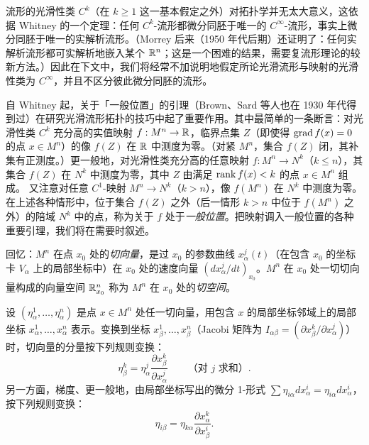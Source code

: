 流形的光滑性类 $C^k$（在 $k\ge1$ 这一基本假定之外）对拓扑学并无太大意义，这依据 Whitney 的一个定理：任何 $C^k$-流形都微分同胚于唯一的 $C^\infty$-流形，事实上微分同胚于唯一的实解析流形。（Morrey 后来（1950 年代后期）还证明了：任何实解析流形都可实解析地嵌入某个 $\mathbb{R}^n$；这是一个困难的结果，需要复流形理论的较新方法。）因此在下文中，我们将经常不加说明地假定所论光滑流形与映射的光滑性类为 $C^\infty$，并且不区分彼此微分同胚的流形。

自 Whitney 起，关于「一般位置」的引理（Brown、Sard 等人也在 1930 年代得到过）在研究光滑流形拓扑的技巧中起了重要作用。其中最简单的一条断言：对光滑性类 $C^k$ 充分高的实值映射 $f:M^n\to\mathbb{R}$，临界点集 $Z$（即使得 $\operatorname{grad} f(x)=0$ 的点 $x\in M^n$）的像 $f(Z)$ 在 $\mathbb{R}$ 中测度为零。（对紧 $M^n$，集合 $f(Z)$ 闭，其补集有正测度。）更一般地，对光滑性类充分高的任意映射 $f:M^n\to N^k$（$k\le n$），其集合 $f(Z)$ 在 $N^k$ 中测度为零，其中 $Z$ 由满足 $\operatorname{rank} f(x)<k$ 的点 $x\in M^n$ 组成。
又注意对任意 $C^1$-映射 $M^n\to N^k$（$k>n$），像 $f(M^n)$ 在 $N^k$ 中测度为零。在上述各种情形中，位于集合 $f(Z)$ 之外（后一情形 $k>n$ 中位于 $f(M^n)$ 之外）的陪域 $N^k$ 中的点，称为关于 $f$ 处于\emph{一般位置}。把映射调入一般位置的各种重要引理，我们将在需要时叙述。

回忆：$M^n$ 在点 $x_0$ 处的\emph{切向量}，是过 $x_0$ 的参数曲线 $x_\alpha^j(t)$（在包含 $x_0$ 的坐标卡 $V_\alpha$ 上的局部坐标中）在 $x_0$ 处的速度向量 $(dx_\alpha^j/dt)_{x_0}$。$M^n$ 在 $x_0$ 处一切切向量构成的向量空间 $\mathbb{R}^n_{x_0}$ 称为 $M^n$ 在 $x_0$ 处的\emph{切空间}。

设 $(\eta_\alpha^1,\ldots,\eta_\alpha^n)$ 是点 $x\in M^n$ 处任一切向量，用包含 $x$ 的局部坐标邻域上的局部坐标 $x_\alpha^1,\ldots,x_\alpha^n$ 表示。变换到坐标 $x_\beta^1,\ldots,x_\beta^n$（Jacobi 矩阵为 $I_{\alpha\beta}=(\partial x_\beta^k/\partial x_\alpha^j)$）时，切向量的分量按下列规则变换：
\begin{equation}
\eta_\beta^k=\eta_\alpha^j\frac{\partial x_\beta^k}{\partial x_\alpha^j}\qquad\text{（对 }j\text{ 求和）}. \tag{1.1}
\end{equation}
另一方面，梯度、更一般地，由局部坐标写出的微分 1-形式 $\sum\eta_{i\alpha}dx_\alpha^i=\eta_{i\alpha}dx_\alpha^i$，按下列规则变换：
\begin{equation}
\eta_{i\beta}=\eta_{k\alpha}\frac{\partial x_\alpha^k}{\partial x_\beta^i}. \tag{1.2}
\end{equation}

